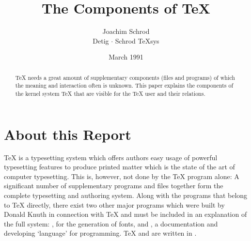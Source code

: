 
%
%





\def\OutputInFigtotal{output}
\def\DriverInFigtotal{\DVI{} driver}






\title{The Components of \TeX{}}
\author{
   Joachim Schrod\\
   Detig$\,\cdot\,$Schrod \TeX{}sys
   }
  \date{March 1991}


\maketitle



 \begin{abstract}
 \TeX{} needs a great amount of supplementary components (files and
programs) of which the meaning and interaction often is unknown. This
paper explains the components of the kernel system \TeX{} that are
visible for the \TeX{} user and their relations.
 \end{abstract}




\section{About this Report}

\TeX{} is a typesetting system which offers authors easy usage of
powerful typesetting features to produce printed matter which is the
state of the art of computer typesetting. This is, however, not done by the
\TeX{} program alone: A significant number of supplementary
programs and files together form the complete typesetting and
authoring system. Along with the programs that belong to \TeX{}
directly, there exist two other major programs which were built by {\sc
Donald Knuth} in connection with \TeX{} and must be included in an
explanation of the full system: \MF{}, for the generation of fonts,
and \WEB{}, a documentation and developing `language' for programming.
\TeX{} and \MF{} are written in \WEB{}.

